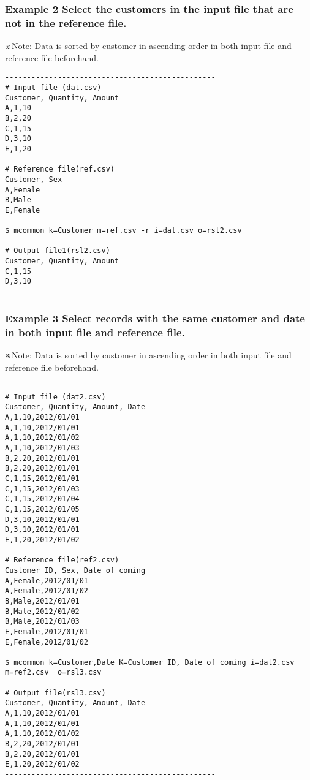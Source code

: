 \documentclass[a4paper]{jarticle}
\begin{document}
\subsubsection*{Example 2 Select the customers in the input file that are not in the reference file.}
\noindent
※Note: Data is sorted by customer in ascending order in both input file and reference file beforehand.

\begin{verbatim}
------------------------------------------------
# Input file (dat.csv)
Customer, Quantity, Amount
A,1,10
B,2,20
C,1,15
D,3,10
E,1,20

# Reference file(ref.csv)
Customer, Sex
A,Female
B,Male
E,Female

$ mcommon k=Customer m=ref.csv -r i=dat.csv o=rsl2.csv

# Output file1(rsl2.csv)
Customer, Quantity, Amount
C,1,15
D,3,10
------------------------------------------------
\end{verbatim}

\subsubsection*{Example 3 Select records with the same customer and date in both input file and reference file. }
\noindent
※Note: Data is sorted by customer in ascending order in both input file and reference file beforehand. 

\begin{verbatim}
------------------------------------------------
# Input file (dat2.csv)
Customer, Quantity, Amount, Date
A,1,10,2012/01/01
A,1,10,2012/01/01
A,1,10,2012/01/02
A,1,10,2012/01/03
B,2,20,2012/01/01
B,2,20,2012/01/01
C,1,15,2012/01/01
C,1,15,2012/01/03
C,1,15,2012/01/04
C,1,15,2012/01/05
D,3,10,2012/01/01
D,3,10,2012/01/01
E,1,20,2012/01/02

# Reference file(ref2.csv)
Customer ID, Sex, Date of coming
A,Female,2012/01/01
A,Female,2012/01/02
B,Male,2012/01/01
B,Male,2012/01/02
B,Male,2012/01/03
E,Female,2012/01/01
E,Female,2012/01/02

$ mcommon k=Customer,Date K=Customer ID, Date of coming i=dat2.csv m=ref2.csv  o=rsl3.csv

# Output file(rsl3.csv)
Customer, Quantity, Amount, Date
A,1,10,2012/01/01
A,1,10,2012/01/01
A,1,10,2012/01/02
B,2,20,2012/01/01
B,2,20,2012/01/01
E,1,20,2012/01/02
------------------------------------------------
\end{verbatim}
\end{document}
